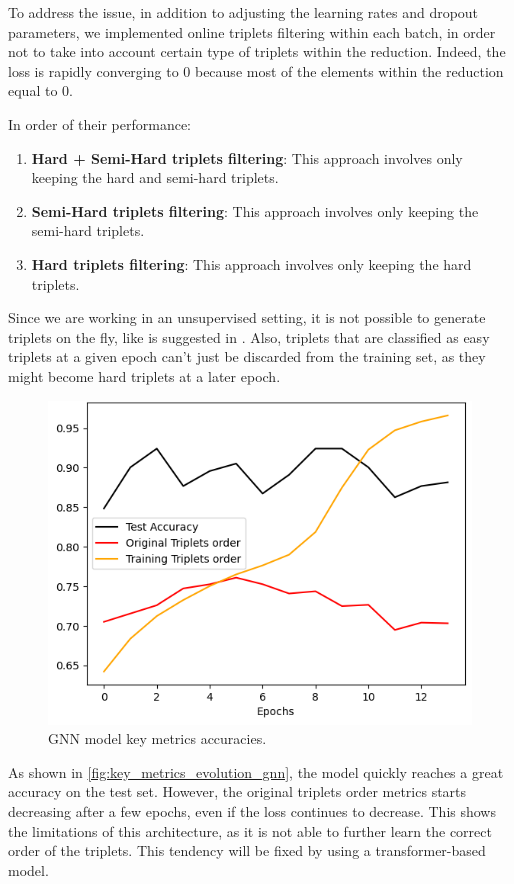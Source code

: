 To address the issue, in addition to adjusting the learning rates and dropout parameters, we implemented online triplets filtering within each batch, in order not to take into account certain type of triplets within the reduction. Indeed, the loss is rapidly converging to 0 because most of the elements within the reduction equal to 0.


In order of their performance:
\begin{enumerate}
    \item \textbf{Hard + Semi-Hard triplets filtering}: This approach involves only keeping the hard and semi-hard triplets. 
    \item \textbf{Semi-Hard triplets filtering}: This approach involves only keeping the semi-hard triplets.
    \item \textbf{Hard triplets filtering}: This approach involves only keeping the hard triplets.
\end{enumerate}

Since we are working in an unsupervised setting, it is not possible to generate triplets on the fly, like is suggested in \cite{moindrotTripletLossOnline2018}. Also, triplets that are classified as easy triplets at a given epoch can't just be discarded from the training set, as they might become hard triplets at a later epoch.


\label{sec:graph-based-models}
\begin{figure}[]
    \centering
    \includegraphics[width=0.5\columnwidth]{images/key_metrics_evolution_gnn.png}
    \caption{GNN model key metrics accuracies.}
    \label{fig:key_metrics_evolution_gnn}
\end{figure}

As shown in \autoref{fig:key_metrics_evolution_gnn}, the model quickly reaches a great accuracy on the test set. However, the original triplets order metrics starts decreasing after a few epochs, even if the loss continues to decrease. This shows the limitations of this architecture, as it is not able to further learn the correct order of the triplets. This tendency will be fixed by using a transformer-based model.


